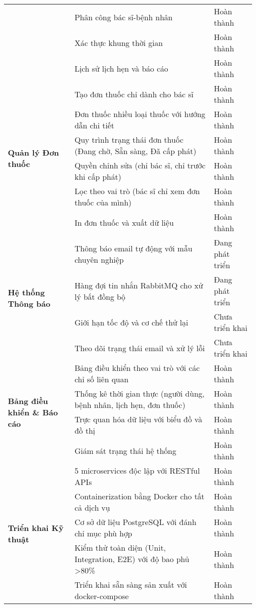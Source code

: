 \documentclass[12pt,a4paper]{report}
\begin{document}
\begin{table}[H]
\begin{tabular}{|p{4cm}|p{8cm}|p{2.5cm}|}
\cline{2-3}
& Phân công bác sĩ-bệnh nhân & Hoàn thành \\
\cline{2-3}
& Xác thực khung thời gian & Hoàn thành \\
\cline{2-3}
& Lịch sử lịch hẹn và báo cáo & Hoàn thành \\
\hline
\multirow{6}{4cm}{\textbf{Quản lý Đơn thuốc}} & Tạo đơn thuốc chỉ dành cho bác sĩ & Hoàn thành \\
\cline{2-3}
& Đơn thuốc nhiều loại thuốc với hướng dẫn chi tiết & Hoàn thành \\
\cline{2-3}
& Quy trình trạng thái đơn thuốc (Đang chờ, Sẵn sàng, Đã cấp phát) & Hoàn thành \\
\cline{2-3}
& Quyền chỉnh sửa (chỉ bác sĩ, chỉ trước khi cấp phát) & Hoàn thành \\
\cline{2-3}
& Lọc theo vai trò (bác sĩ chỉ xem đơn thuốc của mình) & Hoàn thành \\
\cline{2-3}
& In đơn thuốc và xuất dữ liệu & Hoàn thành \\
\hline
\multirow{4}{4cm}{\textbf{Hệ thống Thông báo}} & Thông báo email tự động với mẫu chuyên nghiệp & Đang phát triển \\
\cline{2-3}
& Hàng đợi tin nhắn RabbitMQ cho xử lý bất đồng bộ & Đang phát triển \\
\cline{2-3}
& Giới hạn tốc độ và cơ chế thử lại & Chưa triển khai \\
\cline{2-3}
& Theo dõi trạng thái email và xử lý lỗi & Chưa triển khai \\
\hline
\multirow{4}{4cm}{\textbf{Bảng điều khiển \& Báo cáo}} & Bảng điều khiển theo vai trò với các chỉ số liên quan & Hoàn thành \\
\cline{2-3}
& Thống kê thời gian thực (người dùng, bệnh nhân, lịch hẹn, đơn thuốc) & Hoàn thành \\
\cline{2-3}
& Trực quan hóa dữ liệu với biểu đồ và đồ thị & Hoàn thành \\
\cline{2-3}
& Giám sát trạng thái hệ thống & Hoàn thành \\
\hline
\multirow{5}{4cm}{\textbf{Triển khai Kỹ thuật}} & 5 microservices độc lập với RESTful APIs & Hoàn thành \\
\cline{2-3}
& Containerization bằng Docker cho tất cả dịch vụ & Hoàn thành \\
\cline{2-3}
& Cơ sở dữ liệu PostgreSQL với đánh chỉ mục phù hợp & Hoàn thành \\
\cline{2-3}
& Kiểm thử toàn diện (Unit, Integration, E2E) với độ bao phủ >80\% & Hoàn thành \\
\cline{2-3}
& Triển khai sẵn sàng sản xuất với docker-compose & Hoàn thành \\
\hline
\end{tabular}
\end{table}
\end{document}
